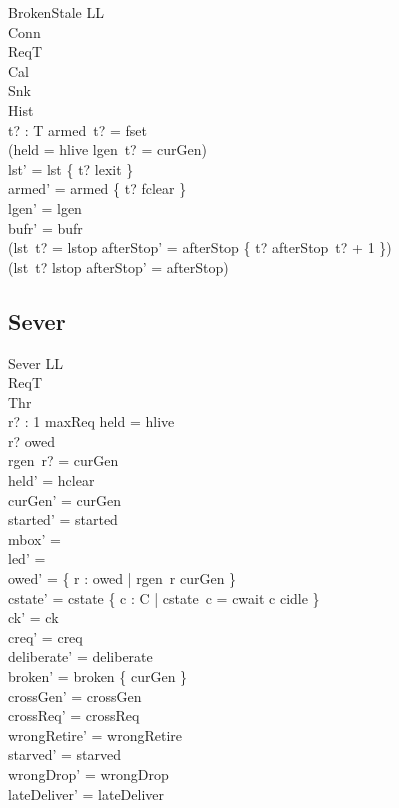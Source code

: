 \documentclass[a4paper,10pt,fleqn]{article}
\begin{document}
\begin{schema}{BrokenStale}
  \Delta LL \\
  \Xi Conn \\
  \Xi ReqT \\
  \Xi Cal \\
  \Xi Snk \\
  \Xi Hist \\
  t? : T
\where
  armed~t? = fset \\
  \lnot (held = hlive \land lgen~t? = curGen) \\
  lst' = lst \oplus \{ t? \mapsto lexit \} \\
  armed' = armed \oplus \{ t? \mapsto fclear \} \\
  lgen' = lgen \\
  bufr' = bufr \\
  (lst~t? = lstop \implies
    afterStop' = afterStop \oplus \{ t? \mapsto afterStop~t? + 1 \}) \\
  (lst~t? \neq lstop \implies afterStop' = afterStop)
\end{schema}

\subsection{Sever}

\begin{schema}{Sever}
  \Delta LL \\
  \Xi ReqT \\
  \Xi Thr \\
  r? : 1 \upto maxReq
\where
  held = hlive \\
  r? \in owed \\
  rgen~r? = curGen \\
  held' = hclear \\
  curGen' = curGen \\
  started' = started \\
  mbox' = \emptyset \\
  led' = \emptyset \\
  owed' = \{ r : owed | rgen~r \neq curGen \} \\
  cstate' = cstate \oplus \{ c : C | cstate~c = cwait \spot c \mapsto cidle \} \\
  ck' = ck \\
  creq' = creq \\
  deliberate' = deliberate \\
  broken' = broken \cup \{ curGen \} \\
  crossGen' = crossGen \\
  crossReq' = crossReq \\
  wrongRetire' = wrongRetire \\
  starved' = starved \\
  wrongDrop' = wrongDrop \\
  lateDeliver' = lateDeliver
\end{schema}
\end{document}

